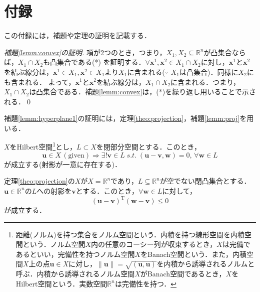 \documentclass[dvipdfmx]{jsreport}
\begin{document}
\chapter{付録}
この付録には，補題や定理の証明を記載する．

\begin{proof}[補題\ref{lemm:convex}の証明]
  項が2つのとき，つまり，$X_1, X_2 \subseteq \mathbb{R}^n$が凸集合ならば，$X_1 \cap X_2$も凸集合である(*)
  を証明する．$\forall \bm{x}^1, \bm{x}^2 \in X_1 \cap X_2$に対し，$\bm{x}^1$と$\bm{x}^2$を結ぶ線分は，$\bm{x}^1 \in X_1, \bm{x}^2 \in X_1$より$X_1$に含まれる($\because$ $X_1$は凸集合)．同様に$X_2$にも含まれる．
  よって，$\bm{x}^1$と$\bm{x}^2$を結ぶ線分は，$X_1 \cap X_2$に含まれる．つまり，$X_1 \cap X_2$は凸集合である．補題\ref{lemm:convex}は，(*)を繰り返し用いることで示される．\qed
\end{proof}

補題\ref{lemm:hyperplane1}の証明には，定理\ref{theo:projection}，補題\ref{lemm:proj}を用いる．

\begin{theo}[射影定理]\label{theo:projection}
  $X$をHilbert空間\footnote{距離(ノルム)を持つ集合をノルム空間という．内積を持つ線形空間を内積空間という．ノルム空間$X$内の任意のコーシー列が収束するとき，$X$は完備であるといい，完備性を持つノルム空間$X$をBanach空間という．また，内積空間$X$上の点$\bm{u} \in X$に対し，$\|\bm{u}\| = \sqrt{(\bm{u}, \bm{u})}$を内積から誘導されるノルムと呼ぶ．内積から誘導されるノルム空間$X$がBanach空間であるとき，$X$をHilbert空間という．実数空間$\mathbb{R}^n$は完備性を持つ．}とし，$L \subset X$を閉部分空間とする．このとき，
  \begin{equation}
    \bm{u} \in X \, (\mathrm{given}) \Rightarrow \exists! \bm{v} \in L \; s.t. \; (\bm{u} - \bm{v}, \bm{w}) = 0, \, \forall \bm{w} \in L \nonumber
  \end{equation}
  が成立する(射影が一意に存在する)．
\end{theo}

\begin{lemm}\label{lemm:proj}
    定理\ref{theo:projection}の$X$が$X = \mathbb{R}^n$であり，$L \subseteq \mathbb{R}^n$が空でない閉凸集合とする．$\bm{u} \in \mathbb{R}^n$の$L$への射影を$\bm{v}$とする．このとき，$\forall \bm{w} \in L$に対して，
  \begin{equation}\label{eq:proj}
    (\bm{u} - \bm{v})^{\mathrm{T}} (\bm{w} - \bm{v}) \leq 0
  \end{equation}
  が成立する．
\end{lemm}
\end{document}
